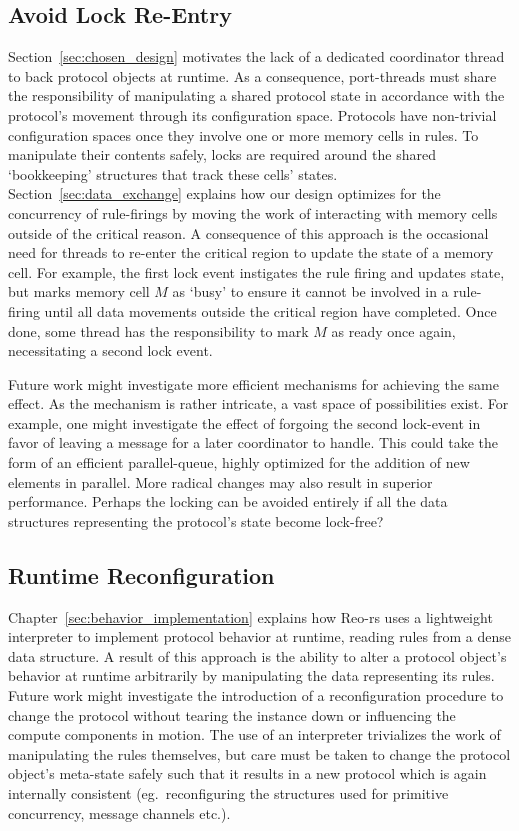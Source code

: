 \subsection{Avoid Lock Re-Entry}
Section~\ref{sec:chosen_design} motivates the lack of a dedicated coordinator thread to back protocol objects at runtime. As a consequence, port-threads must share the responsibility of manipulating a shared protocol state in accordance with the protocol's movement through its configuration space. Protocols have non-trivial configuration spaces once they involve one or more memory cells in rules. To manipulate their contents safely, locks are required around the shared `bookkeeping' structures that track these cells' states. Section~\ref{sec:data_exchange} explains how our design optimizes for the concurrency of rule-firings by moving the work of interacting with memory cells outside of the critical reason. A consequence of this approach is the occasional need for threads to re-enter the critical region to update the state of a memory cell. For example, the first lock event instigates the rule firing and updates state, but marks memory cell $M$ as `busy' to ensure it cannot be involved in a rule-firing until all data movements outside the critical region have completed. Once done, some thread has the responsibility to mark $M$ as ready once again, necessitating a second lock event.

Future work might investigate more efficient mechanisms for achieving the same effect. As the mechanism is rather intricate, a vast space of possibilities exist. For example, one might investigate the effect of forgoing the second lock-event in favor of leaving a message for a later coordinator to handle. This could take the form of an efficient parallel-queue, highly optimized for the addition of new elements in parallel. More radical changes may also result in superior performance. Perhaps the locking can be avoided entirely if all the data structures representing the protocol's state become lock-free?

\subsection{Runtime Reconfiguration}
Chapter~\ref{sec:behavior_implementation} explains how Reo-rs uses a lightweight interpreter to implement protocol behavior at runtime, reading rules from a dense data structure. A result of this approach is the ability to alter a protocol object's behavior at runtime arbitrarily by manipulating the data representing its rules. Future work might investigate the introduction of a reconfiguration procedure to change the protocol without tearing the instance down or influencing the compute components in motion. The use of an interpreter trivializes the work of manipulating the rules themselves, but care must be taken to change the protocol object's meta-state safely such that it results in a new protocol which is again internally consistent (eg.\ reconfiguring the structures used for primitive concurrency, message channels etc.).

